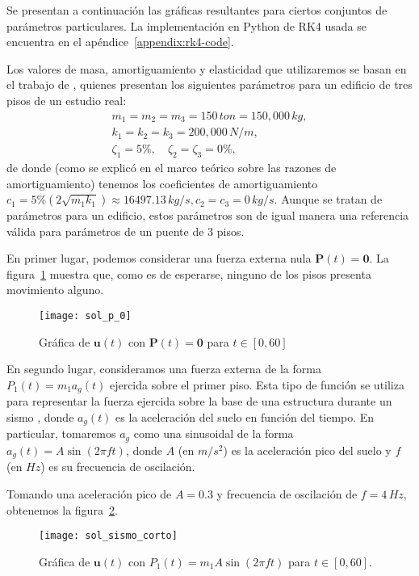 Se presentan a continuación las gráficas resultantes para ciertos conjuntos de parámetros particulares. La implementación en Python de RK4 usada se encuentra en el apéndice~\ref{appendix:rk4-code}.

Los valores de masa, amortiguamiento y elasticidad que utilizaremos se basan en el trabajo de \citet{tarque}, quienes presentan los siguientes parámetros para un edificio de tres pisos de un estudio real:
\begin{gather}
    m_1 = m_2 = m_3 = 150 \, \si{ton} = 150,000 \, \si{kg}, \\
    k_1 = k_2 = k_3 = 200,000 \, \si{N/m}, \\
    \zeta_1 = 5\%, \quad \zeta_2 = \zeta_3 = 0\%
,\end{gather}
de donde (como se explicó en el marco teórico sobre las razones de amortiguamiento) tenemos los coeficientes de amortiguamiento \(c_1 = 5\%(2\sqrt{m_1 k_1}) \approx 16497.13 \, \si{kg/s}, c_2 = c_3 = 0 \, \si{kg/s}\). Aunque se tratan de parámetros para un edificio, estos parámetros son de igual manera una referencia válida para parámetros de un puente de 3 pisos.

En primer lugar, podemos considerar una fuerza externa nula \(\mathbf{P}(t) = \mathbf{0}\). La figura~\ref{fig:sol-p-0} muestra que, como es de esperarse, ninguno de los pisos presenta movimiento alguno.

\begin{figure}[ht!]
    \centering
    \texttt{[image: sol\_p\_0]}
    \caption{Gráfica de \(\mathbf{u}(t)\) con \(\mathbf{P}(t) = \mathbf{0}\) para \(t \in [0, 60]\)}
    \label{fig:sol-p-0}
\end{figure}

En segundo lugar, consideramos una fuerza externa de la forma \(P_1(t) = m_1 a_g(t)\) ejercida sobre el primer piso. Esta tipo de función se utiliza para representar la fuerza ejercida sobre la base de una estructura durante un sismo \citep{kramer}, donde \(a_g(t)\) es la aceleración del suelo en función del tiempo. En particular, tomaremos \(a_g\) como una sinusoidal de la forma \(a_g(t) = A\sin(2\pi f t)\), donde \(A\) (en \(\si{m/s^2}\)) es la aceleración pico del suelo y \(f\) (en \(\si{Hz}\)) es su frecuencia de oscilación.

Tomando una aceleración pico de \(A = 0.3\) y frecuencia de oscilación de \(f = 4 \, \si{Hz}\), obtenemos la figura~\ref{fig:sol-sismo-corto}.

\begin{figure}[ht!]
    \centering
    \texttt{[image: sol\_sismo\_corto]}
    \caption{Gráfica de \(\mathbf{u}(t)\) con \(P_1(t) = m_1 A \sin(2\pi f t)\) para \(t \in [0, 60]\).}
    \label{fig:sol-sismo-corto}
\end{figure}

